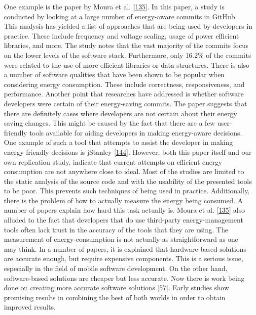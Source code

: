 \documentclass[]{book}
\begin{document}
One example is the paper by Moura et al.
{[}\protect\hyperlink{ref-MPEC2015}{135}{]}. In this paper, a study is
conducted by looking at a large number of energy-aware commits in
GitHub. This analysis has yielded a list of approaches that are being
used by developers in practice. These include frequency and voltage
scaling, usage of power efficient libraries, and more. The study notes
that the vast majority of the commits focus on the lower levels of the
software stack. Furthermore, only 16.2\% of the commits were related to
the use of more efficient libraries or data structures. There is also a
number of software qualities that have been shown to be popular when
considering energy consumption. These include correctness,
responsiveness, and performance. Another point that researches have
addressed is whether software developers were certain of their
energy-saving commits. The paper suggests that there are definitely
cases where developers are not certain about their energy saving
changes. This might be caused by the fact that there are a few
user-friendly tools available for aiding developers in making
energy-aware decisions. One example of such a tool that attempts to
assist the developer in making energy friendly decisions is jStanley
{[}\protect\hyperlink{ref-PSCS2018}{144}{]}. However, both this paper
itself and our own replication study, indicate that current attempts on
efficient energy consumption are not anywhere close to ideal. Most of
the studies are limited to the static analysis of the source code and
with the usability of the presented tools to be poor. This prevents such
techniques of being used in practice. Additionally, there is the problem
of how to actually measure the energy being consumed. A number of papers
explain how hard this task actually is. Moura et al.
{[}\protect\hyperlink{ref-MPEC2015}{135}{]} also alluded to the fact
that developers that do use third-party energy-management tools often
lack trust in the accuracy of the tools that they are using. The
measurement of energy-consumption is not actually as straightforward as
one may think. In a number of papers, it is explained that
hardware-based solutions are accurate enough, but require expensive
components. This is a serious issue, especially in the field of mobile
software development. On the other hand, software-based solutions are
cheaper but less accurate. Now there is work being done on creating more
accurate software solutions
{[}\protect\hyperlink{ref-NPPPZL2017}{57}{]}. Early studies show
promising results in combining the best of both worlds in order to
obtain improved results.
\end{document}
